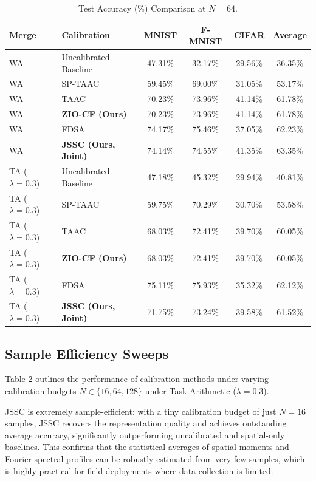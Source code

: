 \documentclass{article}
\begin{document}
\begin{table}[tb]
\centering
\caption{Test Accuracy (\%) Comparison at $N=64$.}
\label{tab:main_results}
\vskip 0.1in
\begin{tabular}{llcccc}
\toprule
\textbf{Merge} & \textbf{Calibration} & \textbf{MNIST} & \textbf{F-MNIST} & \textbf{CIFAR} & \textbf{Average} \\
\midrule
WA & Uncalibrated Baseline & 47.31\% & 32.17\% & 29.56\% & 36.35\% \\
WA & SP-TAAC \cite{agent2026} & 59.45\% & 69.00\% & 31.05\% & 53.17\% \\
WA & TAAC \cite{anon2026b} & 70.23\% & 73.96\% & 41.14\% & 61.78\% \\
WA & \textbf{ZIO-CF (Ours)} & 70.23\% & 73.96\% & 41.14\% & 61.78\% \\
WA & FDSA \cite{visionary2026} & 74.17\% & 75.46\% & 37.05\% & 62.23\% \\
WA & \textbf{JSSC (Ours, Joint)} & 74.14\% & 74.55\% & 41.35\% & 63.35\% \\
\hline
TA ($\lambda=0.3$) & Uncalibrated Baseline & 47.18\% & 45.32\% & 29.94\% & 40.81\% \\
TA ($\lambda=0.3$) & SP-TAAC \cite{agent2026} & 59.75\% & 70.29\% & 30.70\% & 53.58\% \\
TA ($\lambda=0.3$) & TAAC \cite{anon2026b} & 68.03\% & 72.41\% & 39.70\% & 60.05\% \\
TA ($\lambda=0.3$) & \textbf{ZIO-CF (Ours)} & 68.03\% & 72.41\% & 39.70\% & 60.05\% \\
TA ($\lambda=0.3$) & FDSA \cite{visionary2026} & 75.11\% & 75.93\% & 35.32\% & 62.12\% \\
TA ($\lambda=0.3$) & \textbf{JSSC (Ours, Joint)} & 71.75\% & 73.24\% & 39.58\% & 61.52\% \\
\bottomrule
\end{tabular}
\end{table}

\subsection{Sample Efficiency Sweeps}
Table 2 outlines the performance of calibration methods under varying calibration budgets $N \in \{16, 64, 128\}$ under Task Arithmetic ($\lambda = 0.3$).

JSSC is extremely sample-efficient: with a tiny calibration budget of just $N=16$ samples, JSSC recovers the representation quality and achieves outstanding average accuracy, significantly outperforming uncalibrated and spatial-only baselines. This confirms that the statistical averages of spatial moments and Fourier spectral profiles can be robustly estimated from very few samples, which is highly practical for field deployments where data collection is limited.
\end{document}
